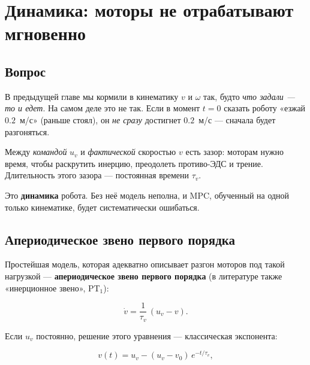 \chapter{Динамика: моторы не отрабатывают мгновенно}
\label{ch:dynamics}

\section{Вопрос}

В предыдущей главе мы кормили в кинематику $v$ и $\omega$ так, будто
\emph{что задали --- то и едет}. На самом деле это не так. Если в
момент $t=0$ сказать роботу «езжай $0.2$~м/с» (раньше стоял), он
\emph{не сразу} достигнет $0.2$~м/с --- сначала будет разгоняться.

\begin{ideabox}
Между \emph{командой} $u_v$ и \emph{фактической} скоростью $v$ есть
зазор: моторам нужно время, чтобы раскрутить инерцию, преодолеть
противо-ЭДС и трение. Длительность этого зазора --- постоянная времени
$\tau_v$.

Это \textbf{динамика} робота. Без неё модель неполна, и MPC,
обученный на одной только кинематике, будет систематически ошибаться.
\end{ideabox}

\section{Апериодическое звено первого порядка}

Простейшая модель, которая адекватно описывает разгон моторов под
такой нагрузкой --- \textbf{апериодическое звено первого порядка}
(в литературе также «инерционное звено», PT$_1$):

\begin{formulabox}[title={Динамика линейной скорости}]
\begin{equation}
  \dot{v} = \frac{1}{\tau_v}\,(u_v - v).
  \label{eq:motor_lin_dyn}
\end{equation}
\end{formulabox}

Если $u_v$ постоянно, решение этого уравнения --- классическая экспонента:

\begin{equation}
  v(t) = u_v - (u_v - v_0)\,e^{-t/\tau_v},
  \label{eq:exp_response}
\end{equation}

